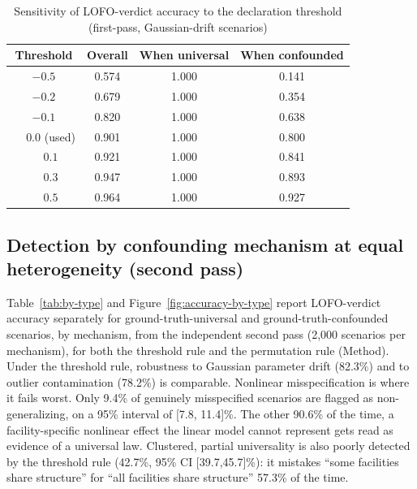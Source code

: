 \documentclass[journal=dce]{CUP-JNL-DTM}%
\begin{document}
\begin{table}[htbp]
\centering
\caption{Sensitivity of LOFO-verdict accuracy to the declaration threshold (first-pass, Gaussian-drift scenarios)}
\label{tab:threshold}
\begin{tabular}{cccc}
\toprule
Threshold & Overall & When universal & When confounded \\
\midrule
$-0.5$ & 0.574 & 1.000 & 0.141 \\
$-0.2$ & 0.679 & 1.000 & 0.354 \\
$-0.1$ & 0.820 & 1.000 & 0.638 \\
$\phantom{-}0.0$ (used) & 0.901 & 1.000 & 0.800 \\
$\phantom{-}0.1$ & 0.921 & 1.000 & 0.841 \\
$\phantom{-}0.3$ & 0.947 & 1.000 & 0.893 \\
$\phantom{-}0.5$ & 0.964 & 1.000 & 0.927 \\
\bottomrule
\end{tabular}
\end{table}

\subsection{Detection by confounding mechanism at equal heterogeneity (second pass)}
\label{sec:results-v2}
\label{sec:perm-vs-threshold}

Table~\ref{tab:by-type} and Figure~\ref{fig:accuracy-by-type} report LOFO-verdict accuracy separately for ground-truth-universal and ground-truth-confounded scenarios, by mechanism, from the independent second pass (2,000 scenarios per mechanism), for both the threshold rule and the permutation rule (Method). Under the threshold rule, robustness to Gaussian parameter drift (82.3\%) and to outlier contamination (78.2\%) is comparable. Nonlinear misspecification is where it fails worst. Only 9.4\% of genuinely misspecified scenarios are flagged as non-generalizing, on a 95\% interval of [7.8, 11.4]\%. The other 90.6\% of the time, a facility-specific nonlinear effect the linear model cannot represent gets read as evidence of a universal law. Clustered, partial universality is also poorly detected by the threshold rule (42.7\%, 95\% CI [39.7,45.7]\%): it mistakes ``some facilities share structure'' for ``all facilities share structure'' 57.3\% of the time.
\end{document}
